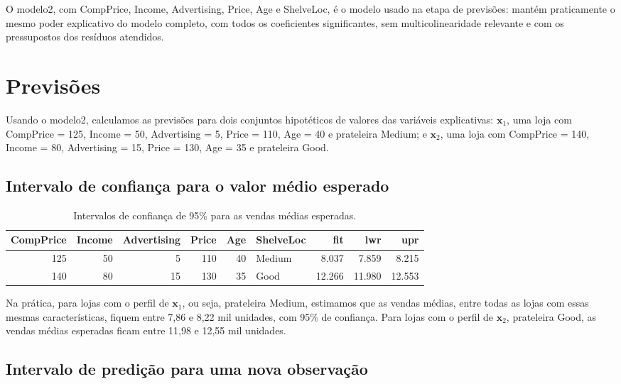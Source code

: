 \documentclass[a4paper]{modeloUFCG} %
\begin{document}
O modelo2, com CompPrice, Income, Advertising, Price, Age e ShelveLoc, é o modelo usado na etapa de previsões: mantém praticamente o mesmo poder explicativo do modelo completo, com todos os coeficientes significantes, sem multicolinearidade relevante e com os pressupostos dos resíduos atendidos.

\section{Previsões}\label{previsuxf5es}

Usando o modelo2, calculamos as previsões para dois conjuntos hipotéticos de valores das variáveis explicativas: \(\mathbf{x}_1\), uma loja com CompPrice = 125, Income = 50, Advertising = 5, Price = 110, Age = 40 e prateleira Medium; e \(\mathbf{x}_2\), uma loja com CompPrice = 140, Income = 80, Advertising = 15, Price = 130, Age = 35 e prateleira Good.

\subsection{Intervalo de confiança para o valor médio esperado}\label{intervalo-de-confianuxe7a-para-o-valor-muxe9dio-esperado}

\begin{table}

\caption{\label{tab:previsaoConfianca}Intervalos de confiança de 95\% para as vendas médias esperadas.}
\centering
\begin{tabular}[t]{r|r|r|r|r|l|r|r|r}
\hline
CompPrice & Income & Advertising & Price & Age & ShelveLoc & fit & lwr & upr\\
\hline
125 & 50 & 5 & 110 & 40 & Medium & 8.037 & 7.859 & 8.215\\
\hline
140 & 80 & 15 & 130 & 35 & Good & 12.266 & 11.980 & 12.553\\
\hline
\end{tabular}
\end{table}

Na prática, para lojas com o perfil de \(\mathbf{x}_1\), ou seja, prateleira Medium, estimamos que as vendas médias, entre todas as lojas com essas mesmas características, fiquem entre 7,86 e 8,22 mil unidades, com 95\% de confiança. Para lojas com o perfil de \(\mathbf{x}_2\), prateleira Good, as vendas médias esperadas ficam entre 11,98 e 12,55 mil unidades.

\subsection{Intervalo de predição para uma nova observação}\label{intervalo-de-prediuxe7uxe3o-para-uma-nova-observauxe7uxe3o}
\end{document}
